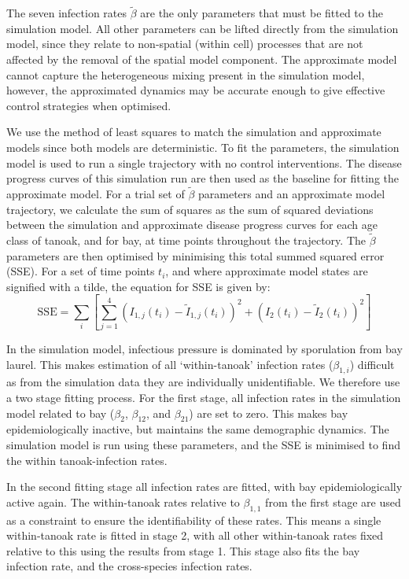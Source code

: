 The seven infection rates $\tilde{\beta}$ are the only parameters that must be fitted to the simulation model. All other parameters can be lifted directly from the simulation model, since they relate to non-spatial (within cell) processes that are not affected by the removal of the spatial model component. The approximate model cannot capture the heterogeneous mixing present in the simulation model, however, the approximated dynamics may be accurate enough to give effective control strategies when optimised.

We use the method of least squares to match the simulation and approximate models since both models are deterministic. To fit the parameters, the simulation model is used to run a single trajectory with no control interventions. The disease progress curves of this simulation run are then used as the baseline for fitting the approximate model. For a trial set of $\tilde{\beta}$ parameters and an approximate model trajectory, we calculate the sum of squares as the sum of squared deviations between the simulation and approximate disease progress curves for each age class of tanoak, and for bay, at time points throughout the trajectory. The $\tilde{\beta}$ parameters are then optimised by minimising this total summed squared error (SSE). For a set of time points $t_i$, and where approximate model states are signified with a tilde, the equation for SSE is given by:
\begin{equation}
    \mathrm{SSE} = \sum_{i}\left[\sum_{j=1}^4\left(I_{1,j}(t_i) - \tilde{I}_{1,j}(t_i)\right)^2 + \left(I_{2}(t_i) - \tilde{I}_{2}(t_i)\right)^2\right]
\end{equation}

In the simulation model, infectious pressure is dominated by sporulation from bay laurel. This makes estimation of all `within-tanoak' infection rates ($\beta_{1,i}$) difficult as from the simulation data they are individually unidentifiable. We therefore use a two stage fitting process. For the first stage, all infection rates in the simulation model related to bay ($\beta_2$, $\beta_{12}$, and $\beta_{21}$) are set to zero. This makes bay epidemiologically inactive, but maintains the same demographic dynamics. The simulation model is run using these parameters, and the SSE is minimised to find the within tanoak-infection rates.

In the second fitting stage all infection rates are fitted, with bay epidemiologically active again. The within-tanoak rates relative to $\beta_{1,1}$ from the first stage are used as a constraint to ensure the identifiability of these rates. This means a single within-tanoak rate is fitted in stage 2, with all other within-tanoak rates fixed relative to this using the results from stage 1. This stage also fits the bay infection rate, and the cross-species infection rates.

